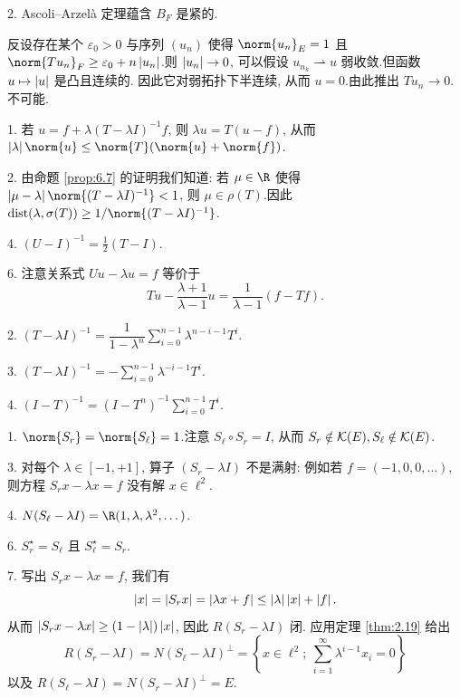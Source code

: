 2. Ascoli--Arzelà 定理蕴含 $B_F$ 是紧的.


反设存在某个 $\varepsilon_0>0$ 与序列 $(u_n)$ 使得 $\norm{u_n}_E=1$ 且
$\norm{Tu_n}_F\ge\varepsilon_0+n\abs{u_n}$.则 $\left|u_n\right|\to0$, 可以假设
$u_{n_k}\rightharpoonup u$ 弱收敛.但函数 $u\mapsto\left|u\right|$ 是凸且连续的.
因此它对弱拓扑下半连续, 从而 $u=0$.由此推出 $Tu_n\to0$.不可能.


1. 若 $u=f+\lambda(T-\lambda I)^{-1}f$, 则 $\lambda u=T(u-f)$, 从而
$\abs{\lambda}\norm{u}\le\norm{T}(\norm{u}+\norm{f})$.

2. 由命题  \ref{prop:6.7} 的证明我们知道: 若 $\mu\in\R$ 使得
$\abs{\mu-\lambda}\norm{(T-\lambda I)^{-1}}<1$, 则 $\mu\in\rho(T)$.因此
$\dist(\lambda,\sigma(T))\ge1/\norm{(T-\lambda I)^{-1}}$.

4. $(U-I)^{-1}=\frac12(T-I)$.

6. 注意关系式 $Uu-\lambda u=f$ 等价于
\begin{equation*}
Tu-\frac{\lambda+1}{\lambda-1}u=\frac{1}{\lambda-1}(f-Tf).
\end{equation*}


2. $(T-\lambda I)^{-1}=\dfrac{1}{1-\lambda^n}\sum_{i=0}^{n-1}\lambda^{n-i-1}T^i$.

3. $(T-\lambda I)^{-1}=-\sum_{i=0}^{n-1}\lambda^{-i-1}T^i$.

4. $(I-T)^{-1}=(I-T^n)^{-1}\sum_{i=0}^{n-1}T^i$.


1. $\norm{S_r}=\norm{S_\ell}=1$.注意 $S_\ell\circ S_r=I$, 从而
$S_r\notin\mathcal{K}(E),S_\ell\notin\mathcal{K}(E)$.

3. 对每个 $\lambda\in[-1,+1]$, 算子 $(S_r-\lambda I)$ 不是满射: 例如若
$f=(-1,0,0,\dots)$, 则方程 $S_rx-\lambda x=f$ 没有解 $x\in\ell^2$.

4. $N(S_\ell-\lambda I)=\R(1,\lambda,\lambda^2,\dots)$.

6. $S_r^\star=S_\ell$ 且 $S_\ell^\star=S_r$.

7. 写出 $S_rx-\lambda x=f$, 我们有
\begin{equation*}
\left|x\right|=\left|S_rx\right|=\left|\lambda x+f\right|\le\left|\lambda\right|\left|x\right|+\left|f\right|.
\end{equation*}
从而 $\left|S_rx-\lambda x\right|\ge(1-\left|\lambda\right|)\left|x\right|$, 因此 $R(S_r-\lambda I)$ 闭.
应用定理  \ref{thm:2.19} 给出
\begin{equation*}
R(S_r-\lambda I)=N(S_\ell-\lambda I)^\perp
=\left\{x\in\ell^2;\ \sum_{i=1}^\infty\lambda^{i-1}x_i=0\right\}
\end{equation*}
以及 $R(S_\ell-\lambda I)=N(S_r-\lambda I)^\perp=E$.

